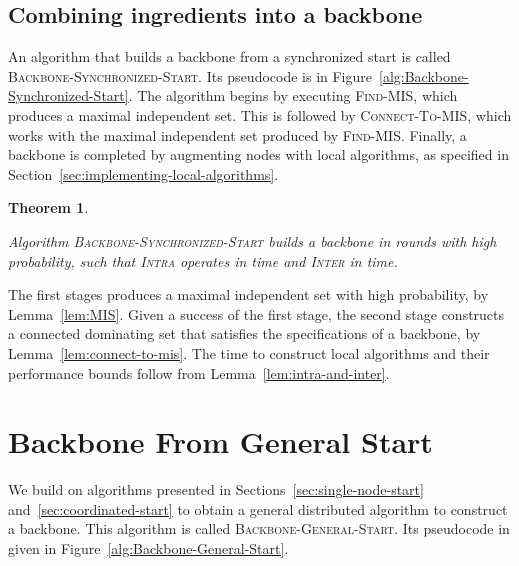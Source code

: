 \documentclass[11pt]{article}
\newcommand{\qed}{\hfill  \smallskip}
\newenvironment{proof}{\noindent{\bf Proof:}}{\qed}
\newtheorem{theorem}{Theorem}
\begin{document}
\subsection{Combining ingredients into a backbone}

\label{sec:synchronized-start-combining-into-backbone}



An algorithm that builds a backbone from a synchronized start is called \textsc{Backbone-Synchronized-Start}.
Its pseudocode is in Figure~\ref{alg:Backbone-Synchronized-Start}.
The algorithm begins by executing \textsc{Find-MIS}, which produces a maximal independent set.
This is followed by \textsc{Connect-To-MIS}, which works with the maximal independent set produced by \textsc{Find-MIS}.
Finally, a backbone is completed by augmenting nodes with local algorithms, as specified in Section~\ref{sec:implementing-local-algorithms}. 




\begin{theorem}
\label{thm:backbone}

Algorithm \textsc{Backbone-Synchronized-Start} builds a backbone in  rounds with high probability, such that \textsc{Intra} operates in  time and \textsc{Inter} in  time.
\end{theorem}

\begin{proof}
The first stages produces a maximal independent set with high probability, by Lemma~\ref{lem:MIS}.
Given a success of the first stage, the second stage constructs a connected dominating set that satisfies the specifications of a backbone, by Lemma~\ref{lem:connect-to-mis}.
The time to construct local algorithms and their performance bounds follow from Lemma~\ref{lem:intra-and-inter}.
\end{proof}





\section{Backbone From General Start}

\label{sec:backbone-general-start}



We build on algorithms presented in Sections~\ref{sec:single-node-start} and~\ref{sec:coordinated-start} to obtain a general distributed algorithm to construct a backbone.
This algorithm is called \textsc{Backbone-General-Start}.
Its pseudocode in given in Figure~\ref{alg:Backbone-General-Start}.
\end{document}
